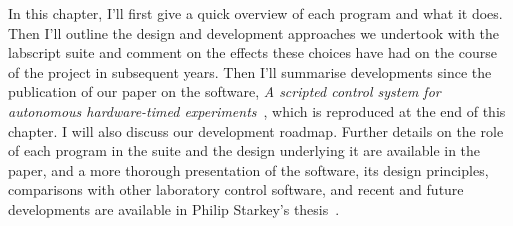 In this chapter, I'll first give a quick overview of each program and what it does. Then I'll outline the design and development approaches we undertook with the labscript suite and comment on the effects these choices have had on the course of the project in subsequent years. Then I'll summarise developments since the publication of our paper on the software, \emph{A scripted control system for autonomous hardware-timed experiments}~\cite{starkey_scripted_2013}, which is reproduced at the end of this chapter. I will also discuss our development roadmap. Further details on the role of each program in the suite and the design underlying it are available in the paper, and a more thorough presentation of the software, its design principles, comparisons with other laboratory control software, and recent and future developments are available in Philip Starkey's thesis~\cite{starkey_thesis_2018}.

